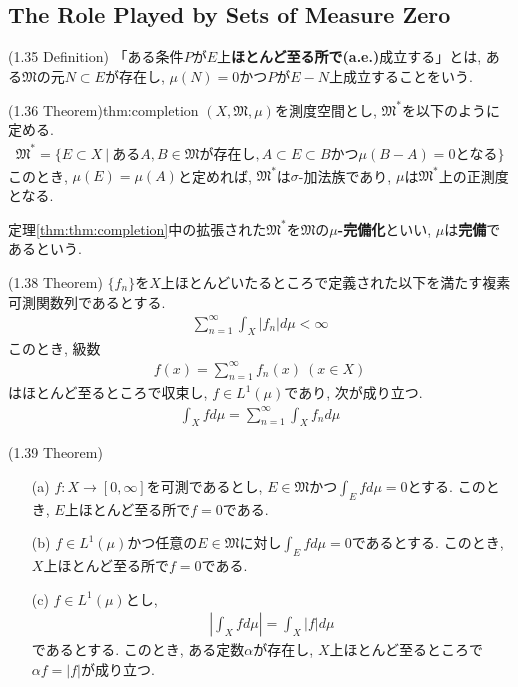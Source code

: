 \documentclass[a4paper]{jsarticle}
\begin{document}
\subsection{The Role Played by Sets of Measure Zero}
\begin{defi}{(1.35 Definition)}{}
    「ある条件$P$が$E$上{\bf ほとんど至る所で(a.e.)}成立する」とは, ある$\mathfrak{M}$の元$N\subset E$が存在し, $\mu(N)=0$かつ$P$が$E-N$上成立することをいう.
\end{defi}

\begin{thm}{(1.36 Theorem)}{thm:completion}
    $(X, \mathfrak{M}, \mu)$を測度空間とし, $\mathfrak{M}^*$を以下のように定める.
    \begin{align*}
        \mathfrak{M}^* = \{ E\subset X \ | \ あるA,B\in \mathfrak{M}が存在し, A\subset E\subset B かつ \mu(B-A)=0 となる \}
    \end{align*}
    このとき, $\mu(E)=\mu(A)$と定めれば, $\mathfrak{M}^*$は$\sigma$-加法族であり, $\mu$は$\mathfrak{M}^*$上の正測度となる.
\end{thm}
\begin{defi}{}{}
    定理\ref{thm:thm:completion}中の拡張された$\mathfrak{M}^*$を$\mathfrak{M}$の{\bf $\mu$-完備化}といい, $\mu$は{\bf 完備}であるという.
\end{defi}

\begin{thm}{(1.38 Theorem)}{}
    $\{f_n\}$を$X$上ほとんどいたるところで定義された以下を満たす複素可測関数列であるとする.
    \begin{align*}
        \sum_{n=1}^\infty \int_X |f_n|d\mu < \infty
    \end{align*}
    このとき, 級数
    \begin{align*}
        f(x) = \sum_{n=1}^\infty f_n(x) \ (x\in X)
    \end{align*}
    はほとんど至るところで収束し, $f\in L^1(\mu)$であり, 次が成り立つ. 
    \begin{align*}
        \int_X fd\mu = \sum_{n=1}^\infty \int_X f_nd\mu
    \end{align*}
\end{thm}
\begin{thm}{(1.39 Theorem)}{}
    \begin{enumerate}
        \item[(a)] $f:X\to [0,\infty]$を可測であるとし, $E\in \mathfrak{M}$かつ$\int_Efd\mu=0$とする. このとき, $E$上ほとんど至る所で$f=0$である.
        \item[(b)] $f\in L^1(\mu)$かつ任意の$E\in \mathfrak{M}$に対し$\int_Efd\mu=0$であるとする. このとき, $X$上ほとんど至る所で$f=0$である.
        \item[(c)] $f\in L^1(\mu)$とし,
        \begin{align*}
            \left|\int_Xfd\mu\right| = \int_X|f|d\mu
        \end{align*}
        であるとする. このとき, ある定数$\alpha$が存在し, $X$上ほとんど至るところで$\alpha f = |f|$が成り立つ.
    \end{enumerate}
\end{thm}
\end{document}
